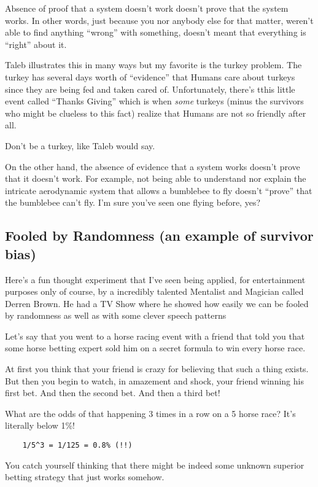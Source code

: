 \documentclass{article}
\begin{document}
Absence of proof that a system doesn't work doesn't prove that the system works. 
In other words, just because you nor anybody else for that matter, weren't able to find anything ``wrong'' with something, doesn't meant that everything is ``right'' about it.

Taleb illustrates this in many ways but my favorite is the turkey problem. The turkey has several days worth of ``evidence'' that Humans care about turkeys since they are being fed and taken cared of. Unfortunately, there's tthis little event called ``Thanks Giving'' which is when \textit{some} turkeys (minus the survivors who might be clueless to this fact) realize that Humans are not so friendly after all. 

Don't be a turkey, like Taleb would say.

On the other hand, the absence of evidence that a system works doesn't prove that it doesn't work. For example, not being able to understand nor explain the intricate aerodynamic system that allows a bumblebee to fly doesn't ``prove'' that the bumblebee can't fly. I'm sure you've seen one flying before, yes?

\subsection{Fooled by Randomness (an example of survivor bias)}

Here's a fun thought experiment that I've seen being applied, for entertainment purposes only of course, by a incredibly talented Mentalist and Magician called Derren Brown. He had a TV Show where he showed how easily we can be fooled by randomness as well as with some clever speech patterns

Let's say that you went to a horse racing event with a friend that told you that some horse betting expert sold him on a secret formula to win every horse race. 

At first you think that your friend is crazy for believing that such a thing exists.
But then you begin to watch, in amazement and shock, your friend winning his first bet. And then the second bet. And then a third bet! 

What are the odds of that happening 3 times in a row on a 5 horse race? It's literally below 1\%!

\begin{lstlisting}
	1/5^3 = 1/125 = 0.8% (!!)
\end{lstlisting}

You catch yourself thinking that there might be indeed some unknown superior betting strategy that just works somehow.
\end{document}
